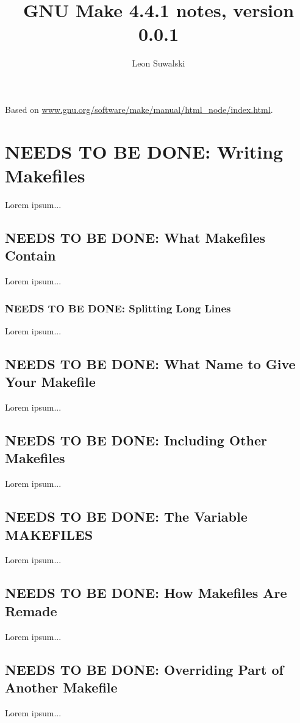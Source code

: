 \documentclass{charun}
\title{GNU Make 4.4.1 notes, version 0.0.1}
\author{Leon Suwalski}
\begin{document}
\begin{multicols*}{2}
\maketitle
\raggedright

Based on \url{www.gnu.org/software/make/manual/html_node/index.html}.



\color{gray}
\section{NEEDS TO BE DONE: Writing Makefiles}
Lorem ipsum...
\color{black}


\color{gray}
\subsection{NEEDS TO BE DONE: What Makefiles Contain}
Lorem ipsum...
\color{black}

\color{gray}
\subsubsection{NEEDS TO BE DONE: Splitting Long Lines}
Lorem ipsum...
\color{black}

\color{gray}
\subsection{NEEDS TO BE DONE: What Name to Give Your Makefile}
Lorem ipsum...
\color{black}

\color{gray}
\subsection{NEEDS TO BE DONE: Including Other Makefiles}
Lorem ipsum...
\color{black}

\color{gray}
\subsection{NEEDS TO BE DONE: The Variable MAKEFILES}
Lorem ipsum...
\color{black}

\color{gray}
\subsection{NEEDS TO BE DONE: How Makefiles Are Remade}
Lorem ipsum...
\color{black}

\color{gray}
\subsection{NEEDS TO BE DONE: Overriding Part of Another Makefile}
Lorem ipsum...
\color{black}


\end{multicols*}
\end{document}
